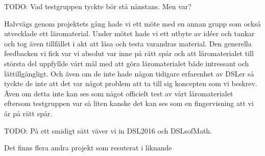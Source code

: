 \begin{binge}
TODO: Vad testgruppen tyckte bör stå nånstans. Men var?

Halvvägs genom projektets gång hade vi ett möte med en annan grupp som också utvecklade ett läromaterial. Under mötet hade vi ett utbyte av idéer och tankar och tog även tillfället i akt att läsa och testa varandras material. Den generella feedbacken vi fick var vi absolut var inne på rätt spår och att läromaterialet till största del uppfyllde vårt mål med att göra läromaterialet både intressant och lättillgängligt. Och även om de inte hade någon tidigare erfarenhet av DSLer så tyckte de inte att det var något problem att ta till sig koncepten som vi beskrev. Även om detta inte kan ses som något officielt test av vårt läromaterialet eftersom testgruppen var så liten kanske det kan ses som en fingervisning att vi är på rätt spår.

TODO: På ett smidigt sätt väver vi in DSL2016 och DSLsofMath.

Det finns flera andra projekt som resuterat i liknande 

\end{binge}
































